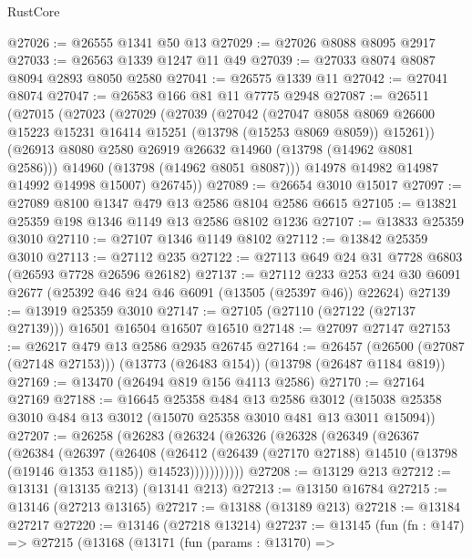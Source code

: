 \begin{lexlean}{RustCore}
\begin{coremodule}
@27026 := @26555 @1341 @50 @13
@27029 := @27026 @8088 @8095 @2917
@27033 := @26563 @1339 @1247 @11 @49
@27039 := @27033 @8074 @8087 @8094 @2893 @8050 @2580
@27041 := @26575 @1339 @11
@27042 := @27041 @8074
@27047 := @26583 @166 @81 @11 @7775 @2948
@27087 := @26511
    (@27015
      (@27023
        (@27029
          (@27039
            (@27042
              (@27047
                @8058
                @8069
                @26600
                @15223
                @15231
                @16414
                @15251
                (@13798 (@15253 @8069 @8059))
                @15261))
            (@26913 @8080 @2580 @26919 @26632 @14960 (@13798 (@14962 @8081 @2586)))
            @14960
            (@13798 (@14962 @8051 @8087)))
          @14978
          @14982
          @14987
          @14992
          @14998
          @15007)
        @26745))
@27089 := @26654 @3010 @15017
@27097 := @27089 @8100 @1347 @479 @13 @2586 @8104 @2586 @6615
@27105 := @13821 @25359 @198 @1346 @1149 @13 @2586 @8102 @1236
@27107 := @13833 @25359 @3010
@27110 := @27107 @1346 @1149 @8102
@27112 := @13842 @25359 @3010
@27113 := @27112 @235
@27122 := @27113 @649 @24 @31 @7728 @6803 (@26593 @7728 @26596 @26182)
@27137 := @27112
    @233
    @253
    @24
    @30
    @6091
    @2677
    (@25392 @46 @24 @46 @6091 (@13505 (@25397 @46)) @22624)
@27139 := @13919 @25359 @3010
@27147 := @27105 (@27110 (@27122 (@27137 @27139))) @16501 @16504 @16507 @16510
@27148 := @27097 @27147
@27153 := @26217 @479 @13 @2586 @2935 @26745
@27164 := @26457
    (@26500 (@27087 (@27148 @27153)))
    (@13773 (@26483 @154))
    (@13798 (@26487 @1184 @819))
@27169 := @13470 (@26494 @819 @156 @4113 @2586)
@27170 := @27164 @27169
@27188 := @16645
    @25358
    @484
    @13
    @2586
    @3012
    (@15038 @25358 @3010 @484 @13 @3012 (@15070 @25358 @3010 @481 @13 @3011 @15094))
@27207 := @26258
    (@26283
      (@26324
        (@26326
          (@26328
            (@26349
              (@26367
                (@26384
                  (@26397
                    (@26408
                      (@26412
                        (@26439
                          (@27170 @27188)
                          @14510
                          (@13798 (@19146 @1353 @1185))
                          @14523)))))))))))
@27208 := @13129 @213
@27212 := @13131 (@13135 @213) (@13141 @213)
@27213 := @13150 @16784
@27215 := @13146 (@27213 @13165)
@27217 := @13188 (@13189 @213)
@27218 := @13184 @27217
@27220 := @13146 (@27218 @13214)
@27237 := @13145
    (fun (fn : @147) =>
    @27215
      (@13168
        (@13171
          (fun (params : @13170) =>

\end{coremodule}
\end{lexlean}
